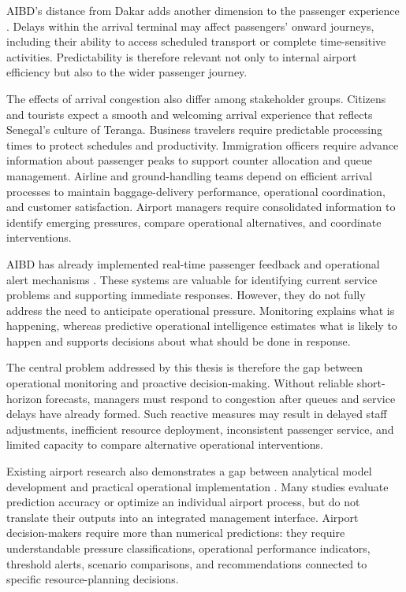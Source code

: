 AIBD's distance from Dakar adds another dimension to the passenger experience \parencite{demir2025speaker}. Delays within the arrival terminal may affect passengers' onward journeys, including their ability to access scheduled transport or complete time-sensitive activities. Predictability is therefore relevant not only to internal airport efficiency but also to the wider passenger journey.

The effects of arrival congestion also differ among stakeholder groups. Citizens and tourists expect a smooth and welcoming arrival experience that reflects Senegal's culture of Teranga. Business travelers require predictable processing times to protect schedules and productivity. Immigration officers require advance information about passenger peaks to support counter allocation and queue management. Airline and ground-handling teams depend on efficient arrival processes to maintain baggage-delivery performance, operational coordination, and customer satisfaction. Airport managers require consolidated information to identify emerging pressures, compare operational alternatives, and coordinate interventions.

AIBD has already implemented real-time passenger feedback and operational alert mechanisms \parencite{demir2025speaker}. These systems are valuable for identifying current service problems and supporting immediate responses. However, they do not fully address the need to anticipate operational pressure. Monitoring explains what is happening, whereas predictive operational intelligence estimates what is likely to happen and supports decisions about what should be done in response.

The central problem addressed by this thesis is therefore the gap between operational monitoring and proactive decision-making. Without reliable short-horizon forecasts, managers must respond to congestion after queues and service delays have already formed. Such reactive measures may result in delayed staff adjustments, inefficient resource deployment, inconsistent passenger service, and limited capacity to compare alternative operational interventions.

Existing airport research also demonstrates a gap between analytical model development and practical operational implementation \parencite{cao2025robust, pang2024machine}. Many studies evaluate prediction accuracy or optimize an individual airport process, but do not translate their outputs into an integrated management interface. Airport decision-makers require more than numerical predictions: they require understandable pressure classifications, operational performance indicators, threshold alerts, scenario comparisons, and recommendations connected to specific resource-planning decisions.

